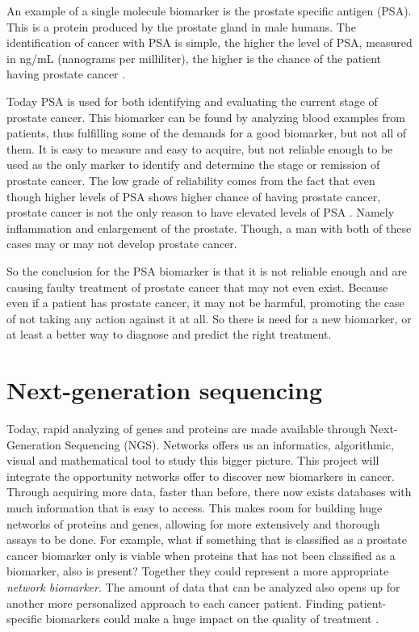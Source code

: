 \documentclass[UKenglish,11pt,a4paper]{article}
\begin{document}
An example of a single molecule biomarker is the prostate specific antigen (PSA). This is a protein produced by the 
prostate gland in male humans. The identification of cancer with PSA is simple, the higher the level of PSA, measured in
ng/mL (nanograms per milliliter), the higher is the chance of the patient having prostate cancer \cite{cancerfacts}.

Today PSA is used for both identifying and evaluating the current stage of prostate cancer. This biomarker can be found 
by analyzing blood examples from patients, thus fulfilling some of the demands for a good biomarker,
but not all of them. It is easy to measure and easy to acquire, but not reliable enough to be used as the only marker
to identify and determine the stage or remission of prostate cancer. The low grade of reliability comes from the fact
that even though higher levels of PSA shows higher chance of having prostate cancer, prostate cancer is not the only
reason to have elevated levels of PSA \cite{cancerfacts}. Namely inflammation and enlargement of the prostate. Though, a
man with both of these cases may or may not develop prostate cancer.

So the conclusion for the PSA biomarker is that it is not reliable enough and are causing faulty treatment of prostate
cancer that may not even exist. Because even if a patient has prostate cancer, it may not be harmful, promoting the case
of not taking any action against it at all. So there is need for a new biomarker, or at least a better way to diagnose
and predict the right treatment.

\chapter{Next-generation sequencing}
Today, rapid analyzing of genes and proteins are made available through Next-Generation Sequencing (NGS)\cite{ngs1}.
Networks offers us an informatics, algorithmic, visual and mathematical tool to study this bigger picture. This
project will integrate the opportunity networks offer to discover new biomarkers in cancer.
Through acquiring more data, faster than before, there now exists databases with much information that is easy to 
access. This makes room for building huge networks of proteins and genes, allowing for more extensively and thorough 
assays to be done. For example, what if something that is classified as a prostate cancer biomarker only is viable when 
proteins that has not been classified as a biomarker, also is present? Together they could represent a more appropriate
\emph{network biomarker}.
The amount of data that can be analyzed also opens up for another more personalized approach to each cancer patient.
Finding patient-specific biomarkers could make a huge impact on the quality of treatment \cite{personalized}.
\end{document}
